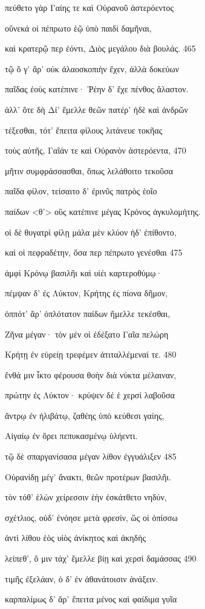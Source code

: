 πεύθετο γὰρ Γαίης τε καὶ Οὐρανοῦ ἀστερόεντος 

οὕνεκά οἱ πέπρωτο ἑῷ ὑπὸ παιδὶ δαμῆναι, 

καὶ κρατερῷ περ ἐόντι, Διὸς μεγάλου διὰ βουλάς. 465 

τῷ ὅ γ' ἄρ' οὐκ ἀλαοσκοπιὴν ἔχεν, ἀλλὰ δοκεύων 

παῖδας ἑοὺς κατέπινε· Ῥέην δ' ἔχε πένθος ἄλαστον. 

ἀλλ' ὅτε δὴ Δί' ἔμελλε θεῶν πατέρ' ἠδὲ καὶ ἀνδρῶν

τέξεσθαι, τότ' ἔπειτα φίλους λιτάνευε τοκῆας

τοὺς αὐτῆς, Γαῖάν τε καὶ Οὐρανὸν ἀστερόεντα, 470

μῆτιν συμφράσσασθαι, ὅπως λελάθοιτο τεκοῦσα

παῖδα φίλον, τείσαιτο δ' ἐρινῦς πατρὸς ἑοῖο 

παίδων \textless{}θ'\textgreater{} οὓς κατέπινε μέγας Κρόνος
ἀγκυλομήτης. 

οἱ δὲ θυγατρὶ φίλῃ μάλα μὲν κλύον ἠδ' ἐπίθοντο, 

καί οἱ πεφραδέτην, ὅσα περ πέπρωτο γενέσθαι 475

ἀμφὶ Κρόνῳ βασιλῆι καὶ υἱέι καρτεροθύμῳ· 

πέμψαν δ' ἐς Λύκτον, Κρήτης ἐς πίονα δῆμον,

ὁππότ' ἄρ' ὁπλότατον παίδων ἤμελλε τεκέσθαι, 

Ζῆνα μέγαν· τὸν μέν οἱ ἐδέξατο Γαῖα πελώρη 

Κρήτῃ ἐν εὐρείῃ τρεφέμεν ἀτιταλλέμεναί τε. 480 

ἔνθά μιν ἷκτο φέρουσα θοὴν διὰ νύκτα μέλαιναν, 

πρώτην ἐς Λύκτον· κρύψεν δέ ἑ χερσὶ λαβοῦσα 

ἄντρῳ ἐν ἠλιβάτῳ, ζαθέης ὑπὸ κεύθεσι γαίης,

Αἰγαίῳ ἐν ὄρει πεπυκασμένῳ ὑλήεντι.

τῷ δὲ σπαργανίσασα μέγαν λίθον ἐγγυάλιξεν 485

Οὐρανίδῃ μέγ' ἄνακτι, θεῶν προτέρων βασιλῆι.

τὸν τόθ' ἑλὼν χείρεσσιν ἑὴν ἐσκάτθετο νηδύν, 

σχέτλιος, οὐδ' ἐνόησε μετὰ φρεσίν, ὥς οἱ ὀπίσσω 

ἀντὶ λίθου ἑὸς υἱὸς ἀνίκητος καὶ ἀκηδὴς

λείπεθ', ὅ μιν τάχ' ἔμελλε βίῃ καὶ χερσὶ δαμάσσας 490

τιμῆς ἐξελάαν, ὁ δ' ἐν ἀθανάτοισιν ἀνάξειν. 

καρπαλίμως δ' ἄρ' ἔπειτα μένος καὶ φαίδιμα γυῖα

